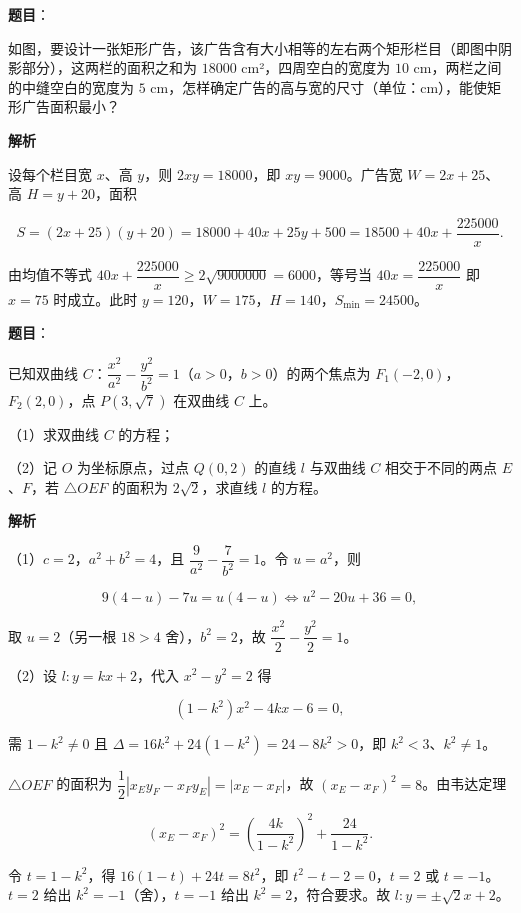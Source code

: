 \begin{answer}

\textbf{题目}：

如图，要设计一张矩形广告，该广告含有大小相等的左右两个矩形栏目（即图中阴影部分），这两栏的面积之和为 $18000$ cm²，四周空白的宽度为 $10$ cm，两栏之间的中缝空白的宽度为 $5$ cm，怎样确定广告的高与宽的尺寸（单位：cm），能使矩形广告面积最小？
\nopagebreak[4]
\begin{center}\end{center}
\nopagebreak[4]
\textbf{解析}

设每个栏目宽 $x$、高 $y$，则 $2xy=18000$，即 $xy=9000$。广告宽 $W=2x+25$、高 $H=y+20$，面积

\nopagebreak[4]
\[S=(2x+25)(y+20)=18000+40x+25y+500=18500+40x+\frac{225000}x.\]

由均值不等式 $40x+\dfrac{225000}x\geqslant2\sqrt{9000000}=6000$，等号当 $40x=\dfrac{225000}x$ 即 $x=75$ 时成立。此时 $y=120$，$W=175$，$H=140$，$S_{\min}=24500$。


\end{answer}
\begin{answer}

\textbf{题目}：

已知双曲线 $C$：$\dfrac{x^2}{a^2}-\dfrac{y^2}{b^2}=1$（$a>0$，$b>0$）的两个焦点为 $F_1(-2,0)$，$F_2(2,0)$，点 $P(3,\sqrt7)$ 在双曲线 $C$ 上。

（1）求双曲线 $C$ 的方程；

（2）记 $O$ 为坐标原点，过点 $Q(0,2)$ 的直线 $l$ 与双曲线 $C$ 相交于不同的两点 $E$、$F$，若 $\triangle OEF$ 的面积为 $2\sqrt2$，求直线 $l$ 的方程。

\textbf{解析}

（1）$c=2$，$a^2+b^2=4$，且 $\dfrac9{a^2}-\dfrac7{b^2}=1$。令 $u=a^2$，则

\nopagebreak[4]
\[9(4-u)-7u=u(4-u)\iff u^2-20u+36=0,\]

取 $u=2$（另一根 $18>4$ 舍），$b^2=2$，故 $\dfrac{x^2}2-\dfrac{y^2}2=1$。

（2）设 $l:y=kx+2$，代入 $x^2-y^2=2$ 得

\nopagebreak[4]
\[(1-k^2)x^2-4kx-6=0,\]

需 $1-k^2\neq0$ 且 $\Delta=16k^2+24(1-k^2)=24-8k^2>0$，即 $k^2<3$、$k^2\neq1$。

$\triangle OEF$ 的面积为 $\dfrac12|x_Ey_F-x_Fy_E|=|x_E-x_F|$，故 $(x_E-x_F)^2=8$。由韦达定理

\nopagebreak[4]
\[(x_E-x_F)^2=\left(\frac{4k}{1-k^2}\right)^2+\frac{24}{1-k^2}.\]

令 $t=1-k^2$，得 $16(1-t)+24t=8t^2$，即 $t^2-t-2=0$，$t=2$ 或 $t=-1$。$t=2$ 给出 $k^2=-1$（舍），$t=-1$ 给出 $k^2=2$，符合要求。故 $l:y=\pm\sqrt2x+2$。


\end{answer}
